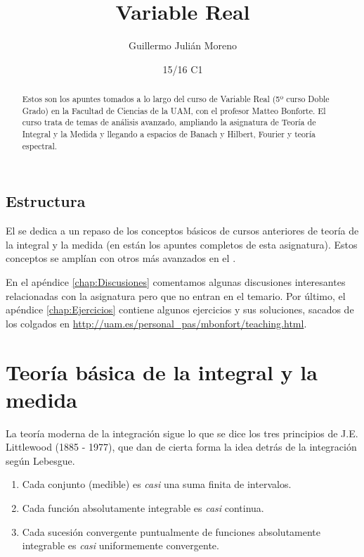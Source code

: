 \documentclass[palatino]{apuntes}
\title{Variable Real}
\author{Guillermo Julián Moreno}
\date{15/16 C1}
\begin{document}
\pagestyle{plain}

\begin{abstract}
Estos son los apuntes tomados a lo largo del curso de Variable Real (5º curso Doble Grado) en la Facultad de Ciencias de la UAM, con el profesor Matteo Bonforte. El curso trata de temas de análisis avanzado, ampliando la asignatura de Teoría de Integral y la Medida \citep{ApuntesTIM} y llegando a espacios de Banach y Hilbert, Fourier y teoría espectral.
\end{abstract}

\maketitle
\section*{Estructura}

El  se dedica a un repaso de los conceptos básicos de cursos anteriores de teoría de la integral y la medida (en \citep{ApuntesTIM} están los apuntes completos de esta asignatura). Estos conceptos se amplían con otros más avanzados en el .

En el apéndice \ref{chap:Discusiones} comentamos algunas discusiones interesantes relacionadas con la asignatura pero que no entran en el temario. Por último, el apéndice \ref{chap:Ejercicios} contiene algunos ejercicios y sus soluciones, sacados de los colgados en \url{http://uam.es/personal_pas/mbonfort/teaching.html}.

\tableofcontents


\chapter{Teoría básica de la integral y la medida}
\label{chap:TeoriaBasicaIntegral}

La teoría moderna de la integración sigue lo que se dice los tres principios de J.E. Littlewood (1885 - 1977), que dan de cierta forma la idea detrás de la integración según Lebesgue.

\begin{enumerate}
\item Cada conjunto (medible) es \textit{casi} una suma finita de intervalos.
\item Cada función absolutamente integrable es \textit{casi} continua.
\item Cada sucesión convergente puntualmente de funciones absolutamente integrable es \textit{casi} uniformemente convergente.
\end{enumerate}
\end{document}
